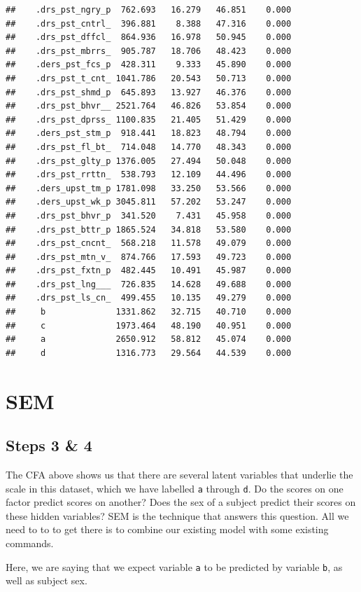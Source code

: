 \documentclass[
]{book}
\begin{document}
\begin{verbatim}
##    .drs_pst_ngry_p  762.693   16.279   46.851    0.000
##    .drs_pst_cntrl_  396.881    8.388   47.316    0.000
##    .drs_pst_dffcl_  864.936   16.978   50.945    0.000
##    .drs_pst_mbrrs_  905.787   18.706   48.423    0.000
##    .ders_pst_fcs_p  428.311    9.333   45.890    0.000
##    .drs_pst_t_cnt_ 1041.786   20.543   50.713    0.000
##    .drs_pst_shmd_p  645.893   13.927   46.376    0.000
##    .drs_pst_bhvr__ 2521.764   46.826   53.854    0.000
##    .drs_pst_dprss_ 1100.835   21.405   51.429    0.000
##    .ders_pst_stm_p  918.441   18.823   48.794    0.000
##    .drs_pst_fl_bt_  714.048   14.770   48.343    0.000
##    .drs_pst_glty_p 1376.005   27.494   50.048    0.000
##    .drs_pst_rrttn_  538.793   12.109   44.496    0.000
##    .ders_upst_tm_p 1781.098   33.250   53.566    0.000
##    .ders_upst_wk_p 3045.811   57.202   53.247    0.000
##    .drs_pst_bhvr_p  341.520    7.431   45.958    0.000
##    .drs_pst_bttr_p 1865.524   34.818   53.580    0.000
##    .drs_pst_cncnt_  568.218   11.578   49.079    0.000
##    .drs_pst_mtn_v_  874.766   17.593   49.723    0.000
##    .drs_pst_fxtn_p  482.445   10.491   45.987    0.000
##    .drs_pst_lng___  726.835   14.628   49.688    0.000
##    .drs_pst_ls_cn_  499.455   10.135   49.279    0.000
##     b              1331.862   32.715   40.710    0.000
##     c              1973.464   48.190   40.951    0.000
##     a              2650.912   58.812   45.074    0.000
##     d              1316.773   29.564   44.539    0.000
\end{verbatim}

\hypertarget{sem}{%
\section{SEM}\label{sem}}

\hypertarget{steps-3-4-1}{%
\subsection{Steps 3 \& 4}\label{steps-3-4-1}}

The CFA above shows us that there are several latent variables that underlie the scale in this dataset, which we have labelled \texttt{a} through \texttt{d}. Do the scores on one factor predict scores on another? Does the sex of a subject predict their scores on these hidden variables? SEM is the technique that answers this question. All we need to to to get there is to combine our existing model with some existing commands.

Here, we are saying that we expect variable \texttt{a} to be predicted by variable \texttt{b}, as well as subject sex.
\end{document}

